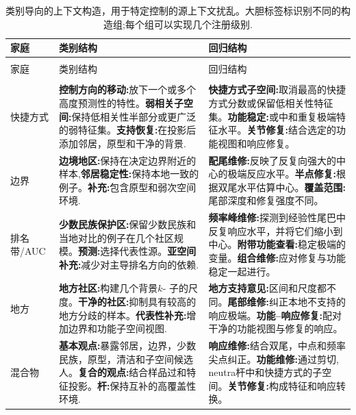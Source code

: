 \begingroup
  \footnotesize
  \setlength{\LTpre}{0.45\baselineskip}
  \setlength{\LTpost}{0.45\baselineskip}
  \begin{longtable}{@{}>{\raggedright\arraybackslash}p{} >{\raggedright\arraybackslash}p{} >{\raggedright\arraybackslash}p{}@{}}
    \caption{类别导向的上下文构造，用于特定控制的源上下文扰乱。大胆标签标识别不同的构造组;每个组可以实现几个注册级别.}
    \label{tab:specific-perturbation-contexts} \\
    \toprule 家庭&类别结构&回归结构\\
    \midrule
    \endfirsthead
    \multicolumn{3}{@{}l}{\tablename~\thetable\ （续）} \\
    \toprule 家庭&类别结构&回归结构\\
    \midrule
    \endhead
    \midrule
    \multicolumn{3}{r@{}}{在下一页继续} \\
    \endfoot
    \bottomrule
    \endlastfoot 快捷方式& \textbf{控制方向的移动:}放下一个或多个高度预测性的特性。\textbf{弱相关子空间:}保持低相关性半部分或更广泛的弱特征集。\textbf{支持恢复:}在投影后添加邻居，原型和干净的背景.
      & \textbf{快捷方式子空间:}取消最高的快捷方式分数或保留低相关性特征集。\textbf{功能稳定:}或中和重复极端特征水平。\textbf{关节修复:}结合选定的功能视图和响应修复。\\
边界& \textbf{边境地区:}保持在决定边界附近的样本,\textbf{邻居稳定性:}保持本地一致的例子。\textbf{补充:}包含原型和弱次空间环境.
      & \textbf{配尾维修:}反映了反复向强大的中心的极端反应水平。\textbf{半点修复:}根据双尾水平估算中心。\textbf{覆盖范围:}尾部深度和修复强度不同。\\
排名带/AUC& \textbf{少数民族保护区:}保留少数民族和当地对比的例子在几个社区规模。\textbf{预测:}选择代表性源。\textbf{亚空间补充:}减少对主导排名方向的依赖.
      & \textbf{频率峰维修:}探测到经验性尾巴中反复响应水平，并将它们缩小到中心。\textbf{附带功能查看:}稳定极端的变量。\textbf{组合维修:}应对修复与功能稳定一起进行。\\
地方& \textbf{地方社区:}构建几个背景$k$- 子的尺度。\textbf{干净的社区:}抑制具有较高的地方分歧的样本。\textbf{代表性补充:}增加边界和功能子空间视图.
      & \textbf{地方支持意见:}区间和尺度都不同。\textbf{尾部维修:}纠正本地不支持的响应极端。\textbf{功能--响应修复:}配对干净的功能视图与修复的响应。\\
混合物& \textbf{基本观点:}暴露邻居，边界，少数民族，原型，清洁和子空间候选人。\textbf{复合的观点:}结合样品过和特征投影。\textbf{杆:}保持互补的高覆盖性环境.
      & \textbf{响应维修:}结合双尾，中点和频率尖点纠正。\textbf{功能维修:}通过剪切, neutra杆中和快捷方式的子空间。\textbf{关节修复:}构成特征和响应转换。\\
  \end{longtable}
\endgroup

